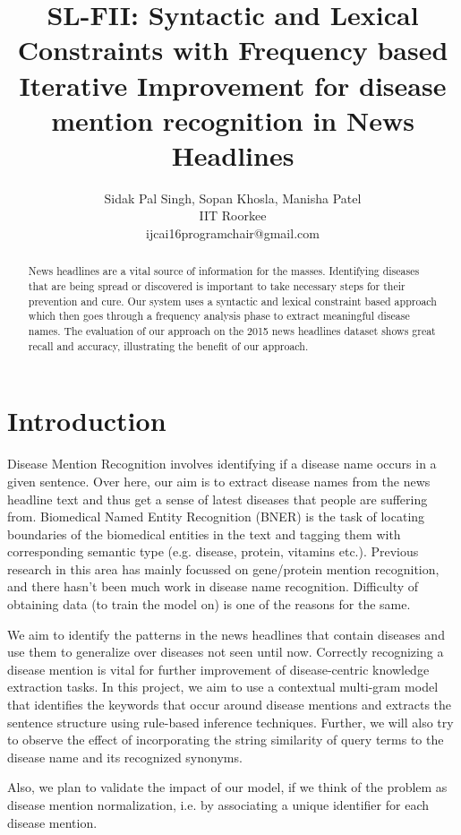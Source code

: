 \documentclass{article}
\title{SL-FII: Syntactic and Lexical Constraints with Frequency based Iterative Improvement for disease mention recognition in News Headlines}
\author{Sidak Pal Singh, Sopan Khosla, Manisha Patel \\ 
IIT Roorkee  \\
ijcai16programchair@gmail.com}
\begin{document}
\maketitle

\begin{abstract}
  News headlines are a vital source of information for the masses. Identifying diseases that are being spread or discovered is important to take necessary steps for their prevention and cure. Our system uses a syntactic and lexical constraint based approach which then goes through a frequency analysis phase to extract meaningful disease names. The evaluation of our approach on the 2015 news headlines dataset shows great recall and accuracy, illustrating the benefit of our approach. 
\end{abstract}

\section{Introduction}

Disease Mention Recognition involves identifying if a disease name occurs in a given
sentence. Over here, our aim is to extract disease names from the news headline text
and thus get a sense of latest diseases that people are suffering from. Biomedical Named
Entity Recognition (BNER) is the task of locating boundaries of the biomedical entities in
the text and tagging them with corresponding semantic type (e.g. disease, protein,
vitamins etc.). Previous research in this area has mainly focussed on gene/protein
mention recognition, and there hasn’t been much work in disease name recognition.
Difficulty of obtaining data (to train the model on) is one of the reasons for the same.

We aim to identify the patterns in the news headlines that contain diseases and use them
to generalize over diseases not seen until now. Correctly recognizing a disease mention is vital for further improvement of disease-centric knowledge extraction tasks. In this
project, we aim to use a contextual multi-gram model that identifies the keywords that
occur around disease mentions and extracts the sentence structure using rule-based
inference techniques. Further, we will also try to observe the effect of incorporating the string similarity of query terms to the disease name and its recognized synonyms. 

Also, we plan to validate the impact of our model, if we think of the problem as disease
mention normalization, i.e. by associating a unique identifier for each disease mention.	
\end{document}
